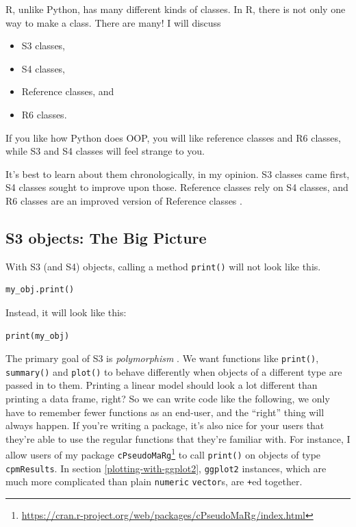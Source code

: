 \documentclass[
  12pt,
  krantz2]{krantz}
\providecommand{\tightlist}{%
  \setlength{\itemsep}{0pt}\setlength{\parskip}{0pt}}
\renewcommand{\href}[2]{#2\footnote{\url{#1}}}
\begin{document}
R, unlike Python, has many different kinds of classes. In R, there is not only one way to make a class. There are many! I will discuss

\begin{itemize}
\tightlist
\item
  S3 classes,
\item
  S4 classes,
\item
  Reference classes, and
\item
  R6 classes.
\end{itemize}

If you like how Python does OOP, you will like reference classes and R6 classes, while S3 and S4 classes will feel strange to you.

It's best to learn about them chronologically, in my opinion. S3 classes came first, S4 classes sought to improve upon those. Reference classes rely on S4 classes, and R6 classes are an improved version of Reference classes \citep{wickham2014advanced}.

\hypertarget{s3-objects-the-big-picture}{%
\subsection{S3 objects: The Big Picture}\label{s3-objects-the-big-picture}}

With S3 (and S4) objects, calling a method \texttt{print()} will not look like this.

\begin{verbatim}
my_obj.print()
\end{verbatim}

Instead, it will look like this:

\begin{verbatim}
print(my_obj)
\end{verbatim}

The primary goal of S3 is \emph{polymorphism} \citep{grolemund2014hands}. We want functions like \texttt{print()}, \texttt{summary()} and \texttt{plot()} to behave differently when objects of a different type are passed in to them. Printing a linear model should look a lot different than printing a data frame, right? So we can write code like the following, we only have to remember fewer functions as an end-user, and the ``right'' thing will always happen. If you're writing a package, it's also nice for your users that they're able to use the regular functions that they're familiar with. For instance, I allow users of my package \href{https://cran.r-project.org/web/packages/cPseudoMaRg/index.html}{\texttt{cPseudoMaRg}} \citep{cpm} to call \texttt{print()} on objects of type \texttt{cpmResults}. In section \ref{plotting-with-ggplot2}, \texttt{ggplot2} instances, which are much more complicated than plain \texttt{numeric} \texttt{vector}s, are \texttt{+}ed together.
\end{document}
